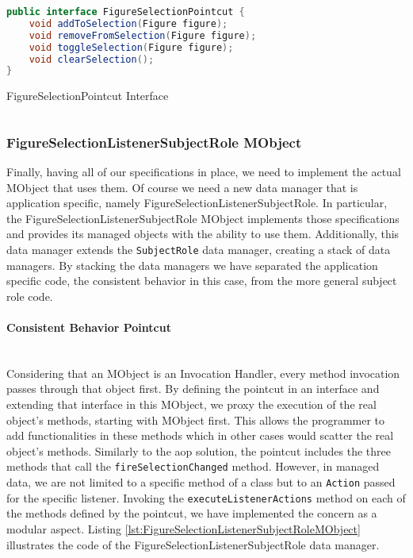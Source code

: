 \begin{sourcecode} [H]
	\begin{lstlisting}[language=Java, escapechar=|]
public interface FigureSelectionPointcut {
	void addToSelection(Figure figure);
	void removeFromSelection(Figure figure);
	void toggleSelection(Figure figure);
	void clearSelection();
}
	\end{lstlisting}
	\caption{FigureSelectionPointcut Interface}
	\label{lst:FigureSelectionPointcut}
\end{sourcecode}

\subsubsection{FigureSelectionListenerSubjectRole MObject}
Finally, having all of our specifications in place, we need to implement the actual MObject that uses them.
Of course we need a new data manager that is application specific, namely FigureSelectionListenerSubjectRole.
In particular, the FigureSelectionListenerSubjectRole MObject implements those specifications and provides its managed objects with the ability to use them.
Additionally, this data manager extends the \texttt{SubjectRole} data manager, creating a stack of data managers.
By stacking the data managers we have separated the application specific code, the consistent behavior in this case, from the more general subject role code.

\paragraph{Consistent Behavior Pointcut}\mbox{}\\
Considering that an MObject is an Invocation Handler, every method invocation passes through that object first.
By defining the pointcut in an interface and extending that interface in this MObject, we proxy the execution of the real object's methods, starting with MObject first.
This allows the programmer to add functionalities in these methods which in other cases would scatter the real object's methods.
Similarly to the \ac{aop} solution, the pointcut includes the three methods that call the \texttt{fireSelectionChanged} method.
However, in managed data, we are not limited to a specific method of a class but to an \texttt{Action} passed for the specific listener.
Invoking the \texttt{executeListenerActions} method on each of the methods defined by the pointcut, we have implemented the concern as a modular aspect.
Listing \ref{lst:FigureSelectionListenerSubjectRoleMObject} illustrates the code of the FigureSelectionListenerSubjectRole data manager.


